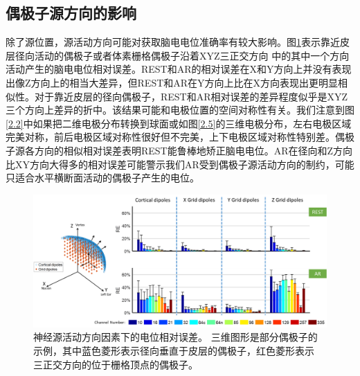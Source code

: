 \subsection{偶极子源方向的影响}
除了源位置，源活动方向可能对获取脑电电位准确率有较大影响。图\ref{2.7}表示靠近皮层径向活动的偶极子或者体素栅格偶极子沿着XYZ三正交方向
中的其中一个方向活动产生的脑电电位相对误差。REST和AR的相对误差在X和Y方向上并没有表现出像Z方向上的相当大差异，但REST和AR在Y方向上比在X方向表现出更明显相似性。对于靠近皮层的径向偶极子，REST和AR相对误差的差异程度似乎是XYZ三个方向上差异的折中。该结果可能和电极位置的空间对称性有关。我们注意到图\ref{2.2}中如果把二维电极分布转换到球面或如图\ref{2.5}的三维电极分布，左右电极区域完美对称，前后电极区域对称性很好但不完美，上下电极区域对称性特别差。偶极子源各方向的相似相对误差表明REST能鲁棒地矫正脑电电位。AR在径向和Z方向比XY方向大得多的相对误差可能警示我们AR受到偶极子源活动方向的制约，可能只适合水平横断面活动的偶极子产生的电位。
\begin{figure}[h!]
	\centering
	\includegraphics[width=15cm]{pic/JNE/figure7.png}
	\caption{神经源活动方向因素下的电位相对误差。 三维图形是部分偶极子的示例，其中蓝色菱形表示径向垂直于皮层的偶极子，红色菱形表示
	三正交方向的位于栅格顶点的偶极子。}
	\label{2.7}
\end{figure}

